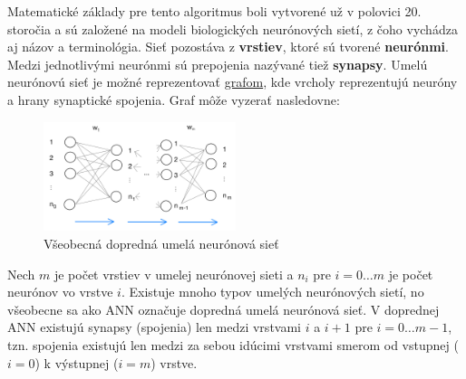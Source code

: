 Matematické základy pre tento algoritmus boli vytvorené už v polovici 20. storočia a sú založené na modeli
biologických neurónových sietí, z čoho vychádza aj názov a terminológia.
Sieť pozostáva z \textbf{vrstiev}, ktoré sú tvorené \textbf{neurónmi}.
Medzi jednotlivými neurónmi sú prepojenia nazývané tiež \textbf{synapsy}.
Umelú neurónovú sieť je možné reprezentovať \hyperref[figure:general-ann]{grafom}, kde vrcholy reprezentujú neuróny
a hrany synaptické spojenia.
Graf môže vyzerať nasledovne:
\begin{figure}[H]
    \centering
    \includegraphics[width=0.5\textwidth]{images/general-ann.jpg}
    \caption{Všeobecná dopredná umelá neurónová sieť}
\end{figure}\label{figure:general-ann}
Nech $m$ je počet vrstiev v umelej neurónovej sieti a $n_i$ pre $i = 0 \dots m$ je počet neurónov vo vrstve $i$.
Existuje mnoho typov umelých neurónových sietí, no všeobecne sa ako ANN označuje dopredná umelá neurónová sieť.
V doprednej ANN existujú synapsy (spojenia) len medzi vrstvami $i$ a $i + 1$ pre $i = 0 \dots m - 1$, tzn. spojenia
existujú len medzi za sebou idúcimi vrstvami smerom od vstupnej ($i=0$) k výstupnej ($i=m$) vrstve.

